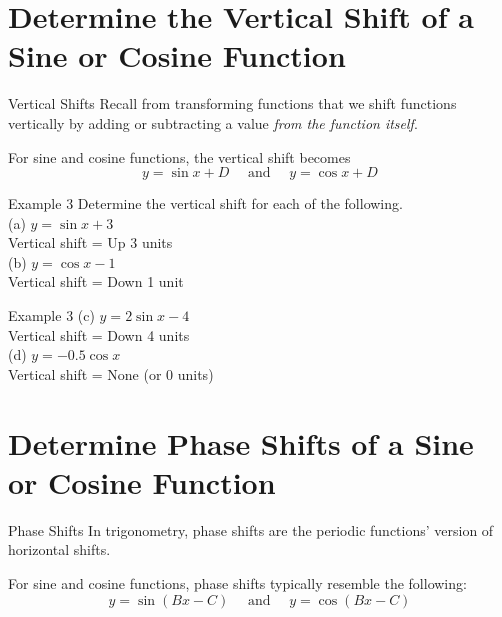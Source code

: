\documentclass[t,usenames,dvipsnames]{beamer}
\begin{document}
\section{Determine the Vertical Shift of a Sine or Cosine Function}

\begin{frame}{Vertical Shifts}
Recall from transforming functions that we shift functions vertically by adding or subtracting a value \emph{from the function itself}.   \newline\\ \pause

For sine and cosine functions, the vertical shift becomes
\[
y = \sin x + D  \quad   \text{ and }    \quad   y = \cos x + D
\]
\end{frame}

\begin{frame}{Example 3}
Determine the vertical shift for each of the following.  \newline\\
(a) \quad $y = \sin x + 3$  \newline\\ \pause
Vertical shift = Up 3 units \newline\\ \pause
(b) \quad $y = \cos x - 1$ \newline\\ \pause
Vertical shift = Down 1 unit
\end{frame}

\begin{frame}{Example 3}
(c) \quad $y = 2\sin x - 4$ \newline\\ \pause
Vertical shift = Down 4 units   \newline\\  \pause
(d) \quad $y = -0.5\cos x$  \newline\\  \pause
Vertical shift = None (or 0 units)
\end{frame}

\section{Determine Phase Shifts of a Sine or Cosine Function}

\begin{frame}{Phase Shifts}
In trigonometry, phase shifts are the periodic functions' version of \alert{horizontal shifts}.  \newline\\  \pause

For sine and cosine functions, phase shifts typically resemble the following:
\[
y = \sin (Bx - C) \quad \text{ and } \quad y = \cos (Bx - C)
\]
\end{frame}
\end{document}
